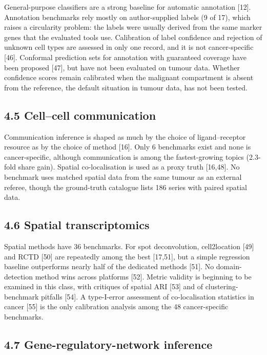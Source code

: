 \documentclass{article}
\begin{document}
General-purpose classifiers are a strong baseline for automatic
annotation {[}12{]}. Annotation benchmarks rely mostly on
author-supplied labels (9 of 17), which raises a circularity problem:
the labels were usually derived from the same marker genes that the
evaluated tools use. Calibration of label confidence and rejection of
unknown cell types are assessed in only one record, and it is not
cancer-specific {[}46{]}. Conformal prediction sets for annotation with
guaranteed coverage have been proposed {[}47{]}, but have not been
evaluated on tumour data. Whether confidence scores remain calibrated
when the malignant compartment is absent from the reference, the default
situation in tumour data, has not been tested.

\subsection{4.5 Cell--cell communication}\label{cellcell-communication}

Communication inference is shaped as much by the choice of
ligand--receptor resource as by the choice of method {[}16{]}. Only 6
benchmarks exist and none is cancer-specific, although communication is
among the fastest-growing topics (2.3-fold share gain). Spatial
co-localisation is used as a proxy truth {[}16,48{]}. No benchmark uses
matched spatial data from the same tumour as an external referee, though
the ground-truth catalogue lists 186 series with paired spatial data.

\subsection{4.6 Spatial transcriptomics}\label{spatial-transcriptomics}

Spatial methods have 36 benchmarks. For spot deconvolution,
cell2location {[}49{]} and RCTD {[}50{]} are repeatedly among the best
{[}17,51{]}, but a simple regression baseline outperforms nearly half of
the dedicated methods {[}51{]}. No domain-detection method wins across
platforms {[}52{]}. Metric validity is beginning to be examined in this
class, with critiques of spatial ARI {[}53{]} and of
clustering-benchmark pitfalls {[}54{]}. A type-I-error assessment of
co-localisation statistics in cancer {[}55{]} is the only calibration
analysis among the 48 cancer-specific benchmarks.

\subsection{4.7 Gene-regulatory-network inference}\label{gene-regulatory-network-inference}
\end{document}
